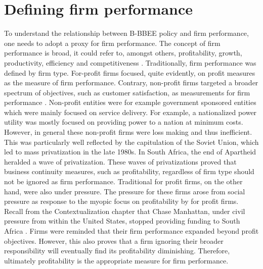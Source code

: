 \section{Defining firm performance}
To understand the relationship between B-BBEE policy and firm performance, one needs to adopt a proxy for firm performance. The concept of firm performance is broad, it could  refer to, amongst others, profitability, growth, productivity, efficiency and competitiveness \cite[p96]{N41}. Traditionally, firm performance was defined by firm type. For-profit firms focused, quite evidently, on profit measures as the measure of firm performance. Contrary, non-profit firms targeted a broader spectrum of objectives, such as customer satisfaction, as measurements for firm performance \cite[p96, p102]{N41}. Non-profit entities were for example government sponsored entities which were mainly focused on service delivery. For example, a nationalized power utility was mostly focused on providing power to a nation at minimum costs. However, in general these non-profit firms were loss making and thus inefficient. This was particularly well reflected by the capitulation of the Soviet Union, which  led to mass privatization in the late 1980s. In South Africa, the end of Apartheid heralded a wave of privatization. These waves of privatizations proved that business continuity measures, such as profitability, regardless of firm type should not be ignored as firm performance. Traditional for profit firms, on the other hand, were also under pressure. The pressure for these firms arose from social pressure as response to the  myopic focus on profitability by for profit firms. Recall from the Contextualization chapter that Chase Manhattan, under civil pressure from within the United States, stopped providing funding to South Africa \cite[p324]{N32}. Firms were reminded that their firm performance expanded beyond profit objectives. However, this also proves that a firm ignoring their broader responsibility will eventually find its profitability diminishing. Therefore, ultimately profitability is the appropriate measure for firm performance.

